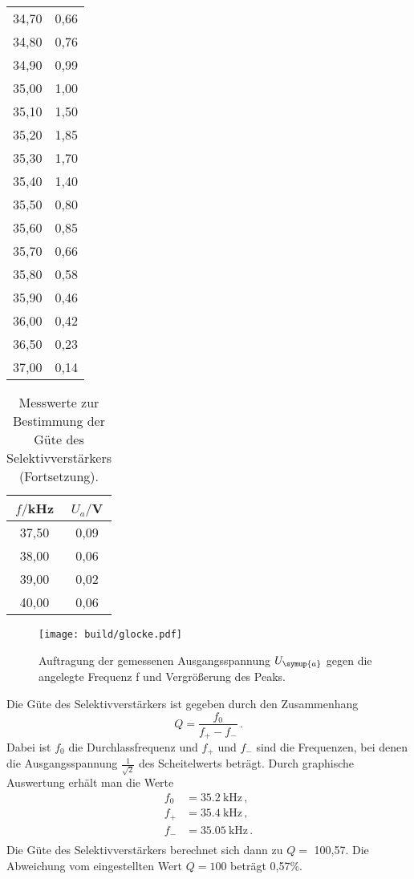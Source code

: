 \begin{table}[htp]
\begin{center}
\begin{tabular}{cc}
			34,70 & 0,66\\
			34,80 & 0,76\\
			34,90 & 0,99\\
			35,00 & 1,00\\
			35,10 & 1,50\\
			35,20 & 1,85\\
			35,30 & 1,70\\
			35,40 & 1,40\\
			35,50 & 0,80\\
			35,60 & 0,85\\
			35,70 & 0,66\\
			35,80 & 0,58\\
			35,90 & 0,46\\
			36,00 & 0,42\\
      36,50 & 0,23\\
      37,00 & 0,14\\
		\bottomrule
		\end{tabular}
	\end{center}
\end{table}
\begin{table}[htp]
	\begin{center}
    \caption{Messwerte zur Bestimmung der Güte des Selektivverstärkers (Fortsetzung).}
    \label{tab:guete2}
		\begin{tabular}{cc}
		\toprule
			{$f/$kHz} & {$U_a/$V}\\
			\midrule
			37,50 & 0,09\\
			38,00 & 0,06\\
			39,00 & 0,02\\
			40,00 & 0,06\\
		\bottomrule
		\end{tabular}
	\end{center}
\end{table}

\begin{figure}
  \centering
  \texttt{[image: build/glocke.pdf]}
  \caption{Auftragung der gemessenen Ausgangsspannung $U_{\symup{a}}$ gegen die angelegte
  Frequenz f und Vergrößerung des Peaks.}
  \label{fig:guete}
\end{figure}

Die Güte des Selektivverstärkers ist gegeben durch den Zusammenhang
\begin{equation}
  Q=\frac{f_0}{f_{+} - f_{-}} \,.
\end{equation}
Dabei ist $f_0$ die Durchlassfrequenz und $f_{+}$ und $f_{-}$ sind die Frequenzen,
bei denen die Ausgangsspannung $\frac{1}{\sqrt{2}}$ des Scheitelwerts beträgt. Durch
graphische Auswertung erhält man die Werte
\begin{align*}
  f_0&=\SI{35.2}{\kilo\hertz}      \,,\\
  f_{+}&=\SI{35.4}{\kilo\hertz}     \,, \\
  f_{-}&=\SI{35.05}{\kilo\hertz}     \,.\\
\end{align*}
Die Güte des Selektivverstärkers berechnet sich dann zu $Q=$ 100,57. Die Abweichung
vom eingestellten Wert $Q=100$ beträgt 0,57\%.


